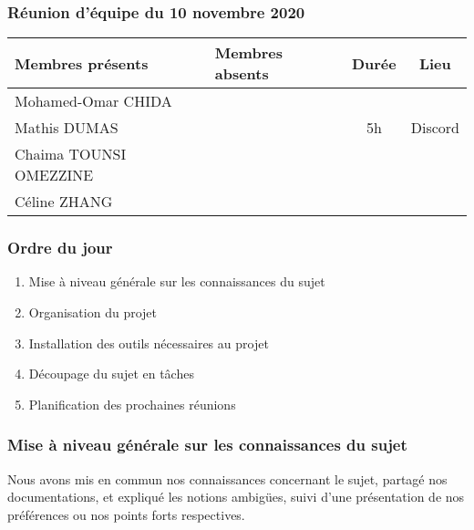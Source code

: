 


% 
\subsubsection*{\large{Réunion d'équipe du 10 novembre 2020}}
\begin{center}
\begin{tabular}{| l | l || c | c |}
    \hline
    Membres présents & Membres absents & Durée & Lieu \\
    \hline
    Mohamed-Omar CHIDA & & & \\ Mathis DUMAS & & 5h & Discord \\ Chaima TOUNSI OMEZZINE & & & \\ Céline ZHANG & & & \\
    \hline
\end{tabular}
\end{center}

\subsubsection*{Ordre du jour}
\begin{enumerate}
    \item Mise à niveau générale sur les connaissances du sujet
    \item Organisation du projet
    \item Installation des outils nécessaires au projet
    \item Découpage du sujet en tâches
    \item Planification des prochaines réunions
\end{enumerate}

\subsubsection*{Mise à niveau générale sur les connaissances du sujet}
Nous avons mis en commun nos connaissances concernant le sujet, partagé nos documentations, et expliqué les notions ambigües, suivi d'une présentation de nos préférences ou nos points forts respectives.

